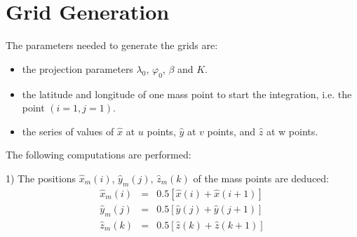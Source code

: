 \section{Grid Generation}

The parameters needed to generate the grids are:
\begin{itemize}
\item the projection parameters $\lambda_{0}$, $\varphi_{0}$, $\beta$ and $K$.
\item the latitude and longitude of one mass point to start the integration,
i.e. the point $(i=1,j=1)$.
\item the series of values of $\widehat{x}$ at $u$ points, $\widehat{y}$
at $v$ points, and $\widehat{z}$ at w points.
\end{itemize}

The following computations are performed:

1) The positions $\widehat{x}_m(i)$, $\widehat{y}_m(j)$, $\widehat{z}_m(k)$
of the mass points are deduced:
\begin{eqnarray}
\widehat{x}_m(i) & = &0.5 \left[ \widehat{x}(i) +\widehat{x}(i+1) \right]
\nonumber \\
\widehat{y}_m(j) & = &0.5 \left[ \widehat{y}(j) +\widehat{y}(j+1) \right] \\
\widehat{z}_m(k) & = &0.5 \left[ \widehat{z}(k) +\widehat{z}(k+1) \right]
\nonumber
\end{eqnarray}

